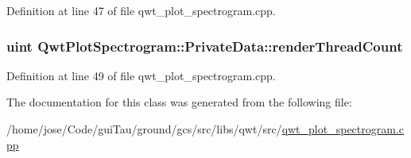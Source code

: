 Definition at line 47 of file qwt\-\_\-plot\-\_\-spectrogram.\-cpp.

\hypertarget{class_qwt_plot_spectrogram_1_1_private_data_a9b7cbbeef79277caceb716b59f23c7f8}{
\subsubsection[{render\-Thread\-Count}]{\setlength{\rightskip}{0pt plus 5cm}uint Qwt\-Plot\-Spectrogram\-::\-Private\-Data\-::render\-Thread\-Count}}\label{class_qwt_plot_spectrogram_1_1_private_data_a9b7cbbeef79277caceb716b59f23c7f8}


Definition at line 49 of file qwt\-\_\-plot\-\_\-spectrogram.\-cpp.



The documentation for this class was generated from the following file\-:\begin{DoxyCompactItemize}
\item 
/home/jose/\-Code/gui\-Tau/ground/gcs/src/libs/qwt/src/\hyperlink{qwt__plot__spectrogram_8cpp}{qwt\-\_\-plot\-\_\-spectrogram.\-cpp}\end{DoxyCompactItemize}
